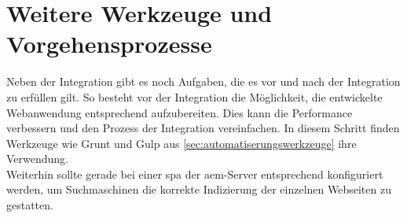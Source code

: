 \section{Weitere Werkzeuge und Vorgehensprozesse}
\label{sec:aufbereiten}
Neben der Integration gibt es noch Aufgaben, die es vor und nach der Integration zu erfüllen gilt. So besteht vor der Integration die Möglichkeit, die entwickelte Webanwendung entsprechend aufzubereiten. Dies kann die Performance verbessern und den Prozess der Integration vereinfachen. In diesem Schritt finden Werkzeuge wie Grunt und Gulp aus \autoref{sec:automatiserungswerkzeuge} ihre Verwendung. \\
Weiterhin sollte gerade bei einer \ac{spa} der \ac{aem}-Server entsprechend konfiguriert werden, um Suchmaschinen die korrekte Indizierung der einzelnen Webseiten zu gestatten.




